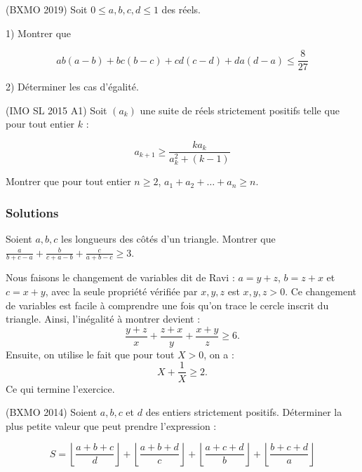 \begin{exo}
(BXMO 2019) Soit $0\leqslant a,b,c,d\leqslant 1$ des réels. 

1) Montrer que 

\[ab(a-b)+bc(b-c)+cd(c-d)+da(d-a) \leqslant \frac{8}{27}\]

2) Déterminer les cas d'égalité. 
\end{exo}




\begin{exo}
(IMO SL 2015 A1)
Soit $(a_k)$ une suite de réels strictement positifs telle que pour tout entier $k$ : 

\[a_{k+1} \geqslant \frac{ka_k}{a_k^2 +(k-1)}\]

Montrer que pour tout entier $n\geqslant 2$, $a_1+a_2+\ldots +a_n \geqslant n$. 
\end{exo}



\subsubsection{Solutions}

\setcounter{exo}{0}
\begin{exo}
Soient $a,b,c$ les longueurs des côtés d'un triangle. Montrer que $\frac{a}{b+c-a}+\frac{b}{c+a-b}+\frac{c}{a+b-c} \geq 3$.
\end{exo}

\begin{sol}
Nous faisons le changement de variables dit de Ravi : $a=y+z$, $b=z+x$ et $c=x+y$, avec la seule propriété vérifiée par $x,y,z$ est $x,y,z>0$. Ce changement de variables est facile à comprendre une fois qu'on trace le cercle inscrit du triangle. Ainsi, l'inégalité à montrer devient :
\[
\frac{y+z}{x}+\frac{z+x}{y}+\frac{x+y}{z} \geq 6.
\]
Ensuite, on utilise le fait que pour tout $X>0$, on a :
\[
X+\frac1{X}\geq 2.
\]
Ce qui termine l'exercice.
\end{sol}



\begin{exo}
(BXMO 2014) Soient $a,b,c$ et $d$ des entiers strictement positifs. Déterminer la plus petite valeur que peut prendre l'expression : 

\[S=\left\lfloor \frac{a+b+c}{d}\right\rfloor + \left\lfloor \frac{a+b+d}{c}\right\rfloor + \left\lfloor \frac{a+c+d}{b}\right\rfloor +\left\lfloor \frac{b+c+d}{a}\right\rfloor\]
\end{exo}

